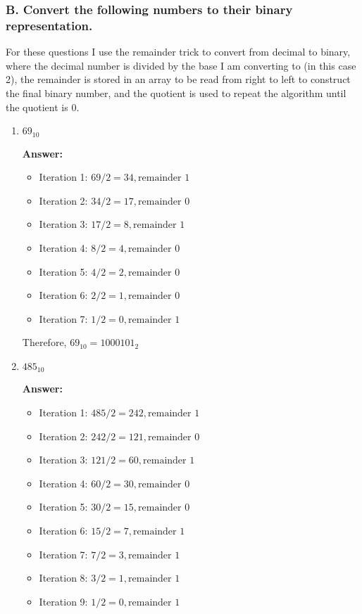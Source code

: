 \documentclass[12pt]{extreport}
\newcommand{\answer}[0]{\medskip \textbf{Answer:} \medskip}
\begin{document}
\subsubsection{B. Convert the following numbers to their binary representation.}

For these questions I use the remainder trick to convert from decimal to binary, where the decimal number is divided by the base I am converting to (in this case 2), the remainder is stored in an array to be read from right to left to construct the final binary number, and the quotient is used to repeat the algorithm until the quotient is 0.

\begin{enumerate}
    
    \item \( 69_{10} \)
    
        \answer
        \begin{itemize}
            \item Iteration 1: \( 69 / 2 = 34, \text{remainder } 1 \)
            \item Iteration 2: \( 34 / 2 = 17, \text{remainder } 0 \)
            \item Iteration 3: \( 17 / 2 = 8, \text{remainder } 1 \)
            \item Iteration 4: \( 8 / 2 = 4, \text{remainder } 0 \)
            \item Iteration 5: \( 4 / 2 = 2, \text{remainder } 0 \)
            \item Iteration 6: \( 2 / 2 = 1, \text{remainder } 0 \)
            \item Iteration 7: \( 1 / 2 = 0, \text{remainder } 1 \)
        \end{itemize}

        Therefore, \( 69_{10} = 1000101_{2} \)

    \item \( 485_{10} \)
    
        \answer
        \begin{itemize}
            \item Iteration 1: \( 485 / 2 = 242, \text{remainder } 1 \)
            \item Iteration 2: \( 242 / 2 = 121, \text{remainder } 0 \)
            \item Iteration 3: \( 121 / 2 = 60, \text{remainder } 1 \)
            \item Iteration 4: \( 60 / 2 = 30, \text{remainder } 0 \)
            \item Iteration 5: \( 30 / 2 = 15, \text{remainder } 0 \)
            \item Iteration 6: \( 15 / 2 = 7, \text{remainder } 1 \)
            \item Iteration 7: \( 7 / 2 = 3, \text{remainder } 1 \)
            \item Iteration 8: \( 3 / 2 = 1, \text{remainder } 1 \)
            \item Iteration 9: \( 1 / 2 = 0, \text{remainder } 1 \)
        \end{itemize}


\end{enumerate}
\end{document}
